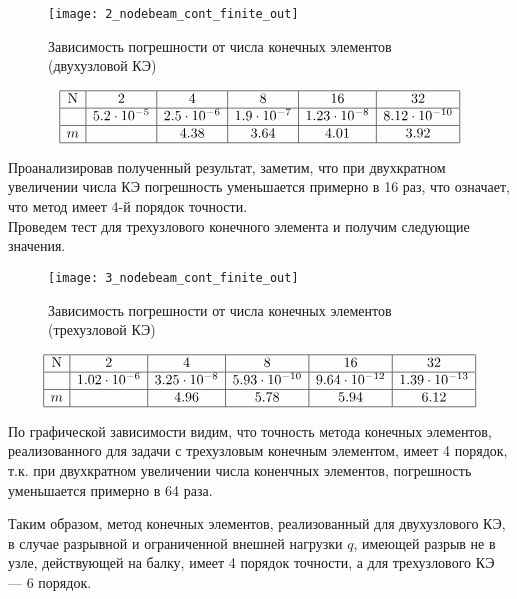\documentclass[12pt,a4paper]{article}
\begin{document}
\begin{figure}[H]
		\centering
		\texttt{[image: 2\_nodebeam\_cont\_finite\_out]}
		\caption{Зависимость погрешности от числа конечных элементов (двухузловой КЭ)}
		\label{fig:2_nodebeam_cont_finite_out}
	\end{figure}

\[
\begin{array}{|c|c|c|c|c|c|}
\hline
\text{N} & 2 & 4 & 8 & 16 & 32 \\ \hline
\Delta  & 5.2 \cdot 10^{-5} & 2.5 \cdot 10^{-6} & 1.9 \cdot 10^{-7} & 1.23 \cdot 10^{-8} & 8.12 \cdot 10^{-10} \\ \hline
m  &  & 4.38 & 3.64 & 4.01 & 3.92 \\ 
\hline
\end{array}
\]

Проанализировав полученный результат, заметим, что при двухкратном увеличении числа КЭ погрешность уменьшается примерно в 16 раз, что означает, что метод имеет 4-й порядок точности.\\


 Проведем тест для трехузлового конечного элемента и получим следующие значения. 
\begin{figure}[H]
		\centering
		\texttt{[image: 3\_nodebeam\_cont\_finite\_out]}
		\caption{Зависимость погрешности от числа конечных элементов (трехузловой КЭ)}
		\label{fig:3_nodebeam_cont_finite_out}
	\end{figure}


\[
\begin{array}{|c|c|c|c|c|c|}
\hline
\text{N} & 2 & 4 & 8 & 16 & 32\\ \hline
\Delta  & 1.02 \cdot 10^{-6} & 3.25 \cdot 10^{-8} & 5.93 \cdot 10^{-10} & 9.64 \cdot 10^{-12} & 1.39 \cdot 10^{-13}\\ \hline
m  &  &  4.96 & 5.78 & 5.94 & 6.12 \\ 
\hline
\end{array}
\]

По графической зависимости видим, что точность метода конечных элементов, реализованного для задачи с 	трехузловым конечным элементом, имеет 4 порядок, т.к. при двухкратном увеличении числа коненчных элементов, погрешность уменьшается примерно в 64 раза. 


Таким образом, метод конечных элементов, реализованный для двухузлового КЭ, в случае разрывной и ограниченной внешней нагрузки $q$, имеющей разрыв не в узле, действующей на балку, имеет 4 порядок точности, а для трехузлового КЭ --- 6 порядок. 
\end{document}
